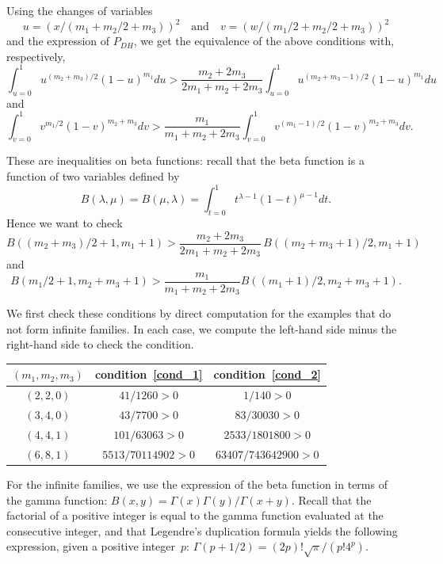 \documentclass[10pt]{amsart}
\theoremstyle{plain}
\theoremstyle{definition}
\begin{document}
Using the changes of variables $$u=(x/(m_1+m_2/2+m_3))^2 \quad\text{and}\quad v=(w/(m_1/2+m_2/2+m_3))^2$$ and the expression of $P_{DH}$,
we get the equivalence of the above conditions with, respectively,
\begin{equation*}
\int_{u=0}^1 u^{(m_2+m_3)/2}(1-u)^{m_1}du
>
\frac{m_2+2m_3}{2m_1+m_2+2m_3}\int_{u=0}^1 u^{(m_2+m_3-1)/2}(1-u)^{m_1}du
\end{equation*}
and
\begin{equation*}
\int_{v=0}^1 v^{m_1/2}(1-v)^{m_2+m_3}dv
>
\frac{m_1}{m_1+m_2+2m_3}\int_{v=0}^1 v^{(m_1-1)/2}(1-v)^{m_2+m_3}dv.
\end{equation*}

These are inequalities on beta functions: recall that the beta function
is a function of two variables defined by
\begin{equation*}
B(\lambda,\mu)=B(\mu,\lambda)=\int_{t=0}^{1}t^{\lambda-1}(1-t)^{\mu-1}dt.
\end{equation*}
Hence we want to check
\begin{equation}
\label{cond_1}
B((m_2+m_3)/2+1,m_1+1)>\frac{m_2+2m_3}{2m_1+m_2+2m_3}\,B((m_2+m_3+1)/2,m_1+1)
\end{equation}
and
\begin{equation}
\label{cond_2}
B(m_1/2+1,m_2+m_3+1)>\frac{m_1}{m_1+m_2+2m_3}B((m_1+1)/2,m_2+m_3+1).
\end{equation}

We first check these conditions by direct computation for the
examples that do not form infinite families. In each case, we
compute the left-hand side minus the right-hand side to check the condition.
\par\smallskip\begin{center}
\begin{tabular}{ccc}
\toprule
$(m_1,m_2,m_3)$ & condition~\eqref{cond_1} & condition~\eqref{cond_2} \\
\midrule
$(2,2,0)$ & $41/1260>0$ & $1/140>0$ \\
$(3,4,0)$ & $43/7700>0$ & $83/30030>0$ \\
$(4,4,1)$ & $101/63063>0$ & $2533/1801800>0$ \\
$(6,8,1)$ & $5513/70114902>0$ & $63407/743642900>0$ \\
\bottomrule
\end{tabular}
\end{center}
\par\smallskip

For the infinite families,
we use the expression of the beta function in terms
of the gamma function: $B(x,y)=\Gamma(x)\Gamma(y)/\Gamma(x+y)$.
Recall that the factorial of a positive integer is equal to the gamma function
evaluated at the consecutive integer, and that Legendre's duplication formula
yields the following expression, given a positive integer~$p$:
$\Gamma(p+1/2)=(2p)!\sqrt{\pi}/(p!4^p)$.
\end{document}
